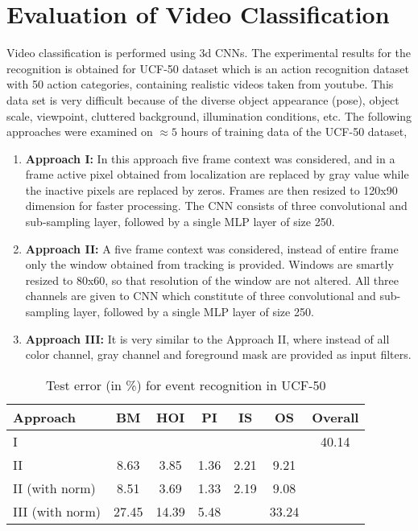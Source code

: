 \section{Evaluation of Video Classification} 
\label{sec:EvVS}
Video classification is performed using 3d CNNs.  The experimental results for the recognition is obtained for UCF-50 dataset which is an action recognition dataset with 50 action categories, containing realistic videos taken from youtube.  This data set is very difficult because of the diverse object appearance (pose), object scale, viewpoint, cluttered background, illumination conditions, etc.  The following approaches were examined on $\approx{5}$ hours of training data of the UCF-50 dataset,
\begin{enumerate}
	\item{\textbf{Approach I:} In this approach five frame context was considered, and in a frame active pixel obtained from localization are replaced by gray value while the inactive pixels are replaced by zeros.  Frames are then resized to 120x90 dimension for faster processing.  The CNN consists of three convolutional and sub-sampling layer,  followed by a single MLP layer of size 250.}
	\item{\textbf{Approach II:} A five frame context was considered, instead of entire frame only the window obtained from tracking is provided.  Windows are smartly resized to 80x60, so that resolution of the window are not altered.  All three channels are given to CNN which constitute of three convolutional and sub-sampling layer,  followed by a single MLP layer of size 250.}
	\item{\textbf{Approach III:} It is very similar to the Approach II, where instead of all color channel, gray channel and foreground mask are provided as input filters.}	
\end{enumerate}
\begin{table}[htbp]
   \caption{Test error (in \%) for event recognition in UCF-50}
   \begin{center}
   \begin{tabular}{|l|c|c|c|c|c|c|} \hline
        \textbf{Approach} & \textbf{BM} & \textbf{HOI} & \textbf{PI} & \textbf{IS} & \textbf{OS} & Overall \\ \hline
        I & & & & & & 40.14\\ \hline
		II & 8.63 & 3.85 & 1.36 & 2.21 & 9.21 & \\ \hline
		II (with norm) & 8.51 & 3.69 & 1.33 & 2.19 & 9.08 & \\ \hline		 
		III (with norm) & 27.45 & 14.39 & 5.48 & & 33.24 & \\ \hline
   \end{tabular}
   \label{tab:recognition}
   \medskip \small 
   \end{center}
 \end{table} 
